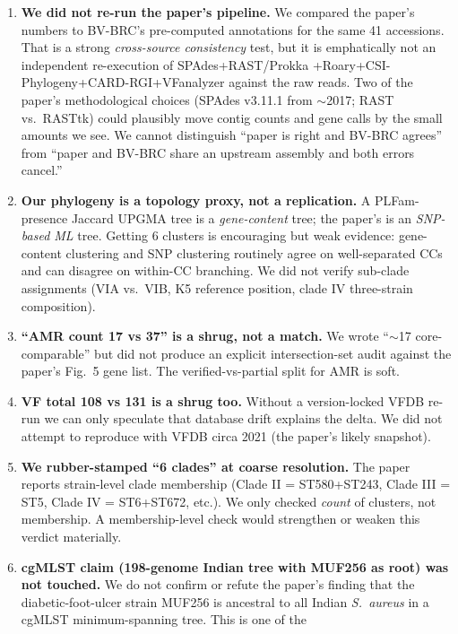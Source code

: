 \documentclass[11pt]{article}
\begin{document}
\begin{enumerate}[leftmargin=1.5em]
    \item \textbf{We did not re-run the paper's pipeline.} We compared the
    paper's numbers to BV-BRC's pre-computed annotations for the same 41
    accessions. That is a strong \emph{cross-source consistency} test, but it
    is emphatically not an independent re-execution of SPAdes+RAST/Prokka
    +Roary+CSI-Phylogeny+CARD-RGI+VFanalyzer against the raw reads. Two of
    the paper's methodological choices (SPAdes v3.11.1 from $\sim$2017;
    RAST vs.\ RASTtk) could plausibly move contig counts and gene calls by
    the small amounts we see. We cannot distinguish ``paper is right and
    BV-BRC agrees'' from ``paper and BV-BRC share an upstream assembly and
    both errors cancel.''
    \item \textbf{Our phylogeny is a topology proxy, not a replication.} A
    PLFam-presence Jaccard UPGMA tree is a \emph{gene-content} tree; the
    paper's is an \emph{SNP-based ML} tree. Getting 6 clusters is
    encouraging but weak evidence: gene-content clustering and SNP clustering
    routinely agree on well-separated CCs and can disagree on within-CC
    branching. We did not verify sub-clade assignments (VIA vs.\ VIB, K5
    reference position, clade IV three-strain composition).
    \item \textbf{``AMR count 17 vs 37'' is a shrug, not a match.} We wrote
    ``$\sim$17 core-comparable'' but did not produce an explicit
    intersection-set audit against the paper's Fig.\ 5 gene list. The
    verified-vs-partial split for AMR is soft.
    \item \textbf{VF total 108 vs 131 is a shrug too.} Without a version-locked
    VFDB re-run we can only speculate that database drift explains the delta.
    We did not attempt to reproduce with VFDB circa 2021 (the paper's likely
    snapshot).
    \item \textbf{We rubber-stamped ``6 clades'' at coarse resolution.} The
    paper reports strain-level clade membership (Clade II = ST580+ST243,
    Clade III = ST5, Clade IV = ST6+ST672, etc.). We only checked \emph{count}
    of clusters, not membership. A membership-level check would strengthen or
    weaken this verdict materially.
    \item \textbf{cgMLST claim (198-genome Indian tree with MUF256 as root)
    was not touched.} We do not confirm or refute the paper's finding that
    the diabetic-foot-ulcer strain MUF256 is ancestral to all Indian
    \emph{S.\ aureus} in a cgMLST minimum-spanning tree. This is one of the

\end{enumerate}
\end{document}
